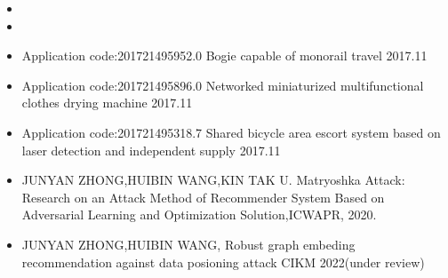 \newpage
{}
  \begin{itemize}[leftmargin=*]
    \item {}
    \item {}
    
  \end{itemize}
  \begin{itemize}[leftmargin=*]
    \item{Application code:201721495952.0 Bogie capable of monorail travel 2017.11}
    \item {Application code:201721495896.0 Networked miniaturized multifunctional 
clothes drying machine 2017.11}
    \item {Application code:201721495318.7 Shared bicycle area escort system based 
on laser detection and independent supply 2017.11}
     \item {JUNYAN ZHONG,HUIBIN WANG,KIN TAK U. Matryoshka Attack: Research on an Attack Method of Recommender System Based on Adversarial Learning and Optimization Solution,ICWAPR, 2020. } 
     \item{JUNYAN ZHONG,HUIBIN WANG, Robust graph embeding recommendation against data posioning attack CIKM 2022(under review)
}
  \end{itemize}